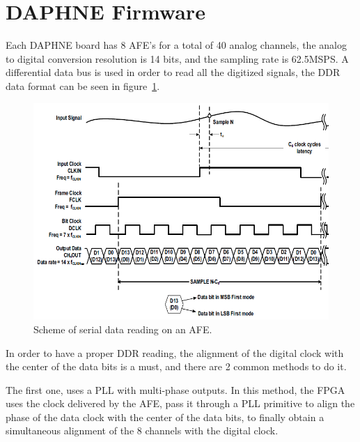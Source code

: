 \section{DAPHNE Firmware}
\label{sec:firmware}

Each DAPHNE board has 8 AFE's for a total of 40 analog channels, the analog to digital conversion resolution is 14 bits,  and the sampling rate is 62.5MSPS. %
A differential data bus is used in order to read all the digitized signals, the DDR data format can be seen in figure~\ref{fig:Datos_AFE}.

\begin{figure}
\centering %
\includegraphics[scale=0.7,origin=c,angle=0]{Images/serial_data_AFE.png}
\caption{\label{fig:Datos_AFE} Scheme of serial data reading on an AFE.}
\end{figure}

In order to have a proper DDR reading, the alignment of the digital clock with the center of the data bits is a must, and there are 2 common methods to do it. 

The first one, uses a PLL with multi-phase outputs. In this method, the FPGA uses the clock delivered by the AFE, pass it through a PLL primitive to align the phase of the data clock with the center of the data bits,  to finally obtain a simultaneous alignment of the 8 channels with the digital clock. 


